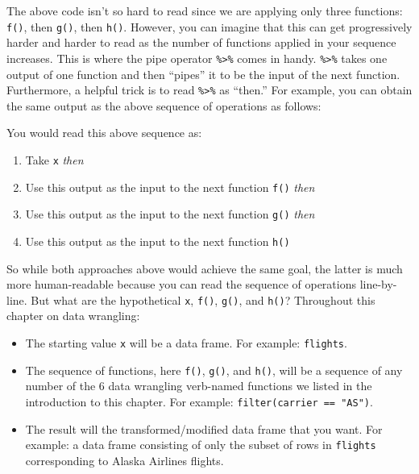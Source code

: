 \documentclass[12pt, krantz2,]{krantz}
\makeatletter
\newenvironment{Shaded}{\begin{snugshade}}{\end{snugshade}}
\newcommand{\KeywordTok}[1]{\textcolor[rgb]{0.27,0.27,0.27}{\textbf{#1}}}
\newcommand{\NormalTok}[1]{#1}
\newcommand{\OperatorTok}[1]{\textcolor[rgb]{0.43,0.43,0.43}{\textbf{#1}}}
\newcommand{\StringTok}[1]{\textcolor[rgb]{0.5,0.5,0.5}{#1}}
\providecommand{\tightlist}{%
  \setlength{\itemsep}{0pt}\setlength{\parskip}{0pt}}
\newenvironment{kframe}{%
\medskip{}
\setlength{\fboxsep}{.8em}
 \def\at@end@of@kframe{}%
 \ifinner\ifhmode%
  \def\at@end@of@kframe{\end{minipage}}%
  \begin{minipage}{\columnwidth}%
 \fi\fi%
 \def\FrameCommand##1{\hskip\@totalleftmargin \hskip-\fboxsep
 \colorbox{shadecolor}{##1}\hskip-\fboxsep
     \hskip-\linewidth \hskip-\@totalleftmargin \hskip\columnwidth}%
 \MakeFramed {\advance\hsize-\width
   \@totalleftmargin\z@ \linewidth\hsize
   \@setminipage}}%
 {\par\unskip\endMakeFramed%
 \at@end@of@kframe}
\renewenvironment{Shaded}{\begin{kframe}}{\end{kframe}}
\makeatother
\begin{document}
The above code isn't so hard to read since we are applying only three functions: \texttt{f()}, then \texttt{g()}, then \texttt{h()}. However, you can imagine that this can get progressively harder and harder to read as the number of functions applied in your sequence increases. This is where the pipe operator \texttt{\%\textgreater{}\%} comes in handy. \texttt{\%\textgreater{}\%} takes one output of one function and then ``pipes'' it to be the input of the next function. Furthermore, a helpful trick is to read \texttt{\%\textgreater{}\%} as ``then.'' For example, you can obtain the same output as the above sequence of operations as follows:

\begin{Shaded}
\end{Shaded}

You would read this above sequence as:

\begin{enumerate}
\def\labelenumi{\arabic{enumi}.}
\tightlist
\item
  Take \texttt{x} \emph{then}
\item
  Use this output as the input to the next function \texttt{f()} \emph{then}
\item
  Use this output as the input to the next function \texttt{g()} \emph{then}
\item
  Use this output as the input to the next function \texttt{h()}
\end{enumerate}

So while both approaches above would achieve the same goal, the latter is much more human-readable because you can read the sequence of operations line-by-line. But what are the hypothetical \texttt{x}, \texttt{f()}, \texttt{g()}, and \texttt{h()}? Throughout this chapter on data wrangling:

\begin{itemize}
\tightlist
\item
  The starting value \texttt{x} will be a data frame. For example: \texttt{flights}.
\item
  The sequence of functions, here \texttt{f()}, \texttt{g()}, and \texttt{h()}, will be a sequence of any number of the 6 data wrangling verb-named functions we listed in the introduction to this chapter. For example: \texttt{filter(carrier\ ==\ "AS")}.
\item
  The result will the transformed/modified data frame that you want. For example: a data frame consisting of only the subset of rows in \texttt{flights} corresponding to Alaska Airlines flights.
\end{itemize}
\end{document}
